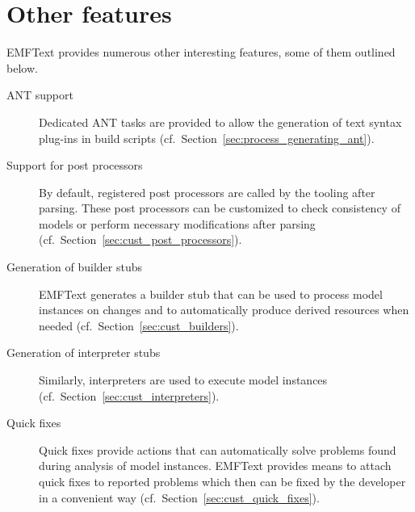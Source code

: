 \section{Other features}

EMFText provides numerous other interesting features, some of them outlined below.

\begin{description}

  \item[ANT support]
        Dedicated ANT tasks are provided to allow the generation of text syntax 
        plug-ins in build scripts (cf.~Section~\ref{sec:process_generating_ant}).
        
  \item[Support for post processors]
        By default, registered post processors are called by the 
        tooling after parsing. These post processors can be customized to
        check consistency of models or perform necessary modifications after
        parsing (cf.~Section~\ref{sec:cust_post_processors}).

  \item[Generation of builder stubs]
        EMFText generates a builder stub that can be used to process 
        model instances on changes and to automatically produce derived 
        resources when needed (cf.~Section~\ref{sec:cust_builders}).
        
  \item[Generation of interpreter stubs]
        Similarly, interpreters are used to execute model instances 
        (cf.~Section~\ref{sec:cust_interpreters}).
  
  \item[Quick fixes]
        Quick fixes provide actions that can automatically solve problems found during
        analysis of model instances. EMFText provides means to attach quick fixes to
        reported problems which then can be fixed by the developer in a convenient way 
        (cf.~Section~\ref{sec:cust_quick_fixes}).
      
\end{description}